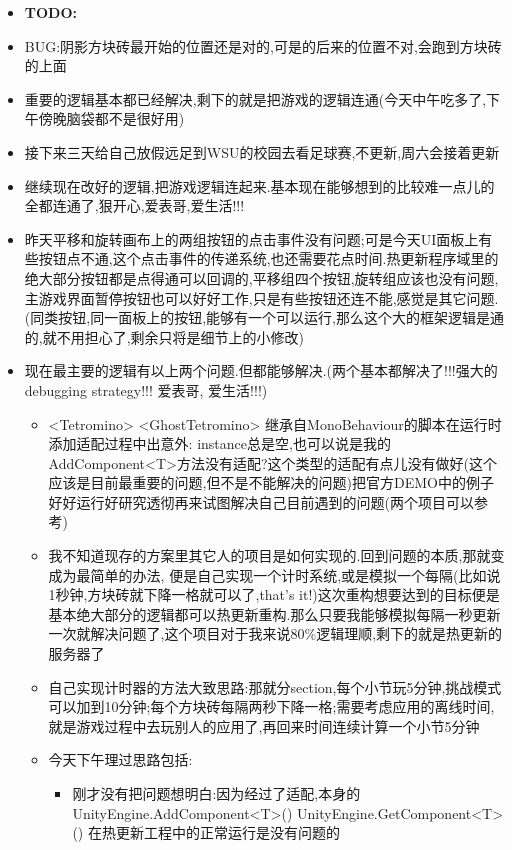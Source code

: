\documentclass[9pt, b5paper]{article}
\begin{document}
\begin{itemize}
\item \textbf{TODO:}
\item BUG:阴影方块砖最开始的位置还是对的,可是的后来的位置不对,会跑到方块砖的上面
\item 重要的逻辑基本都已经解决,剩下的就是把游戏的逻辑连通(今天中午吃多了,下午傍晚脑袋都不是很好用)
\item 接下来三天给自己放假远足到WSU的校园去看足球赛,不更新,周六会接着更新
\item 继续现在改好的逻辑,把游戏逻辑连起来.基本现在能够想到的比较难一点儿的全都连通了,狠开心,爱表哥,爱生活!!!
\item 昨天平移和旋转画布上的两组按钮的点击事件没有问题;可是今天UI面板上有些按钮点不通,这个点击事件的传递系统,也还需要花点时间.热更新程序域里的绝大部分按钮都是点得通可以回调的,平移组四个按钮,旋转组应该也没有问题,主游戏界面暂停按钮也可以好好工作,只是有些按钮还连不能,感觉是其它问题. (同类按钮,同一面板上的按钮,能够有一个可以运行,那么这个大的框架逻辑是通的,就不用担心了,剩余只将是细节上的小修改)
\item 现在最主要的逻辑有以上两个问题.但都能够解决.(两个基本都解决了!!!强大的debugging strategy!!! 爱表哥, 爱生活!!!)
\begin{itemize}
\item <Tetromino> <GhostTetromino> 继承自MonoBehaviour的脚本在运行时添加适配过程中出意外: instance总是空,也可以说是我的AddComponent<T>方法没有适配?这个类型的适配有点儿没有做好(这个应该是目前最重要的问题,但不是不能解决的问题)把官方DEMO中的例子好好运行好研究透彻再来试图解决自己目前遇到的问题(两个项目可以参考)
\item 我不知道现存的方案里其它人的项目是如何实现的.回到问题的本质,那就变成为最简单的办法, 便是自己实现一个计时系统,或是模拟一个每隔(比如说1秒钟,方块砖就下降一格就可以了,that's it!)这次重构想要达到的目标便是基本绝大部分的逻辑都可以热更新重构.那么只要我能够模拟每隔一秒更新一次就解决问题了,这个项目对于我来说80\%逻辑理顺,剩下的就是热更新的服务器了
\item 自己实现计时器的方法大致思路:那就分section,每个小节玩5分钟,挑战模式可以加到10分钟;每个方块砖每隔两秒下降一格;需要考虑应用的离线时间,就是游戏过程中去玩别人的应用了,再回来时间连续计算一个小节5分钟
\item 今天下午理过思路包括:
\begin{itemize}
\item 刚才没有把问题想明白:因为经过了适配,本身的UnityEngine.AddComponent<T>() UnityEngine.GetComponent<T>() 在热更新工程中的正常运行是没有问题的
\begin{itemize}

\end{itemize}
\end{itemize}
\end{itemize}
\end{itemize}
\end{document}
